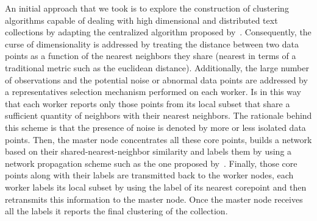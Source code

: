 \documentclass[10pt]{article}
\begin{document}
An initial approach that we took is to explore the construction of clustering algorithms capable of dealing with high dimensional and distributed text collections by adapting the centralized algorithm proposed by~\citep{ESK03}.
Consequently, the curse of dimensionality is addressed by treating the distance between two data points as a function of the nearest neighbors they share (nearest in terms of a traditional metric such as the euclidean distance).
Additionally, the large number of observations and the potential noise or abnormal data points are addressed by a representatives selection mechanism performed on each worker.
Is in this way that each worker reports only those points from its local subset that share a sufficient quantity of neighbors with their nearest neighbors. 
The rationale behind this scheme is that the presence of noise is denoted by more or less isolated data points.
Then, the master node concentrates all these core points, builds a network based on their shared-nearest-neighbor similarity and labels them by using a network propagation scheme such as the one proposed by~\citep{RAK07}.
Finally, those core points along with their labels are transmitted back to the worker nodes, each worker labels its local subset by using the label of its nearest corepoint and then retransmits this information to the master node. Once the master node receives all the labels it reports the final clustering of the collection.


\end{document}
